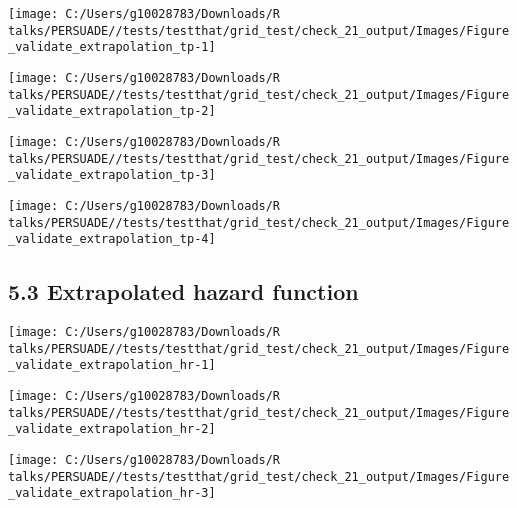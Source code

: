 \documentclass[
]{article}
\begin{document}
\begin{flushleft}\texttt{[image: C:/Users/g10028783/Downloads/R talks/PERSUADE//tests/testthat/grid\_test/check\_21\_output/Images/Figure\_validate\_extrapolation\_tp-1]} \end{flushleft}

\begin{flushleft}\texttt{[image: C:/Users/g10028783/Downloads/R talks/PERSUADE//tests/testthat/grid\_test/check\_21\_output/Images/Figure\_validate\_extrapolation\_tp-2]} \end{flushleft}

\begin{flushleft}\texttt{[image: C:/Users/g10028783/Downloads/R talks/PERSUADE//tests/testthat/grid\_test/check\_21\_output/Images/Figure\_validate\_extrapolation\_tp-3]} \end{flushleft}

\begin{flushleft}\texttt{[image: C:/Users/g10028783/Downloads/R talks/PERSUADE//tests/testthat/grid\_test/check\_21\_output/Images/Figure\_validate\_extrapolation\_tp-4]} \end{flushleft}

\clearpage

\subsection{5.3 Extrapolated hazard
function}\label{extrapolated-hazard-function}

\begin{flushleft}\texttt{[image: C:/Users/g10028783/Downloads/R talks/PERSUADE//tests/testthat/grid\_test/check\_21\_output/Images/Figure\_validate\_extrapolation\_hr-1]} \end{flushleft}

\begin{flushleft}\texttt{[image: C:/Users/g10028783/Downloads/R talks/PERSUADE//tests/testthat/grid\_test/check\_21\_output/Images/Figure\_validate\_extrapolation\_hr-2]} \end{flushleft}

\begin{flushleft}\texttt{[image: C:/Users/g10028783/Downloads/R talks/PERSUADE//tests/testthat/grid\_test/check\_21\_output/Images/Figure\_validate\_extrapolation\_hr-3]} \end{flushleft}
\end{document}

